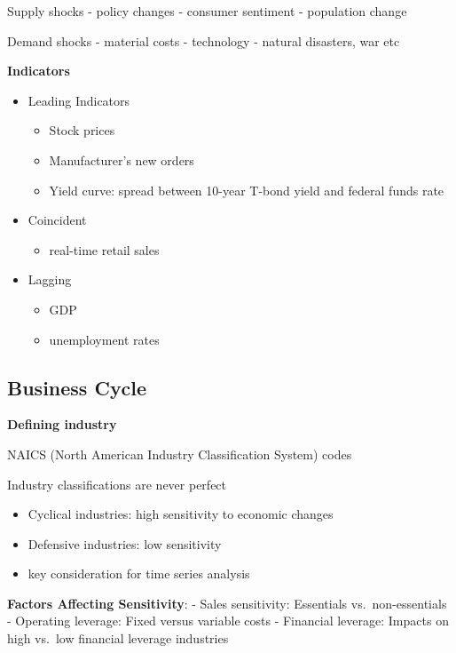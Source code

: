 \documentclass[
]{book}
\providecommand{\tightlist}{%
  \setlength{\itemsep}{0pt}\setlength{\parskip}{0pt}}
\begin{document}
Supply shocks - policy changes - consumer sentiment - population change

Demand shocks - material costs - technology - natural disasters, war etc

\textbf{Indicators}

\begin{itemize}
\tightlist
\item
  Leading Indicators

  \begin{itemize}
  \tightlist
  \item
    Stock prices
  \item
    Manufacturer's new orders
  \item
    Yield curve: spread between 10-year T-bond yield and federal funds
    rate
  \end{itemize}
\item
  Coincident

  \begin{itemize}
  \tightlist
  \item
    real-time retail sales
  \end{itemize}
\item
  Lagging

  \begin{itemize}
  \tightlist
  \item
    GDP
  \item
    unemployment rates
  \end{itemize}
\end{itemize}

\hypertarget{business-cycle}{%
\subsection{Business Cycle}\label{business-cycle}}

\textbf{Defining industry}

NAICS (North American Industry Classification System) codes

Industry classifications are never perfect

\begin{itemize}
\tightlist
\item
  Cyclical industries: high sensitivity to economic changes
\item
  Defensive industries: low sensitivity
\item
  key consideration for time series analysis
\end{itemize}

\textbf{Factors Affecting Sensitivity}: - Sales sensitivity: Essentials
vs.~non-essentials - Operating leverage: Fixed versus variable costs -
Financial leverage: Impacts on high vs.~low financial leverage
industries
\end{document}
